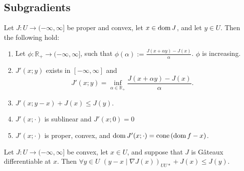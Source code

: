 \subsection{Subgradients}

\begin{proposition}
 Let $J : U \rightarrow (-\infty, \infty]$ be proper and convex, let $x \in 
 \mathrm{dom\,} J$, and let $y \in U$. Then the following hold:
 \begin{enumerate}
 	\item Let $\phi:\mathbb{R}_+\rightarrow (-\infty, \infty]$, such that $\phi(\alpha) := \frac{J(x+\alpha y) -J(x)}{\alpha}$. $\phi$ is increasing.
 	\item $J'(x;y)$ exists in $[-\infty, \infty]$ and  \[J'(x;y)=\inf_{\alpha \in \mathbb{R}_+} \frac{J(x+\alpha y)-J(x)}{\alpha}.\]
 	\item $J'(x; y-x)+J(x)\leq J(y)$.
 	\item $J'(x; \cdot)$ is sublinear and $J'(x; 0)=0$
 	\item $J'(x; \cdot)$ is proper, convex, and $\mathrm{dom\,} J'(x; \cdot) = \mathrm{cone\,}(\mathrm{dom\,} f - x)$.
 \end{enumerate}
\end{proposition}

\begin{proposition}
	Let $J: U \rightarrow (-\infty, \infty]$ be convex, let $x\in U$, and suppose
	that $J$ is G\^ateaux differentiable at $x$. Then $\forall y \in U$ $(y - x \mid \nabla J(x))_{UU*}+J(x) \leq J(y)$.
\end{proposition}	

